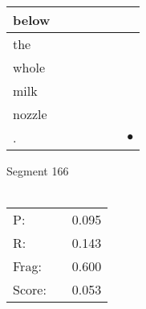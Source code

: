\documentclass[landscape]{article}
\newcommand{\ssp}{\hspace{2pt}}
\newcommand{\mex}{\cellcolor{g}$\bullet$}
\begin{document}
\begin{tabular}{|l|p{10pt}|p{10pt}|p{10pt}|p{10pt}|p{10pt}|p{10pt}|}
\hline
\ssp below \ssp&\hspace{2pt}&\hspace{2pt}&\hspace{2pt}&\hspace{2pt}&\hspace{2pt}&\hspace{2pt}\\
\hline
\ssp the \ssp&\hspace{2pt}&\hspace{2pt}&\hspace{2pt}&\hspace{2pt}&\hspace{2pt}&\hspace{2pt}\\
\hline
\ssp whole \ssp&\hspace{2pt}&\hspace{2pt}&\hspace{2pt}&\hspace{2pt}&\hspace{2pt}&\hspace{2pt}\\
\hline
\ssp milk \ssp&\hspace{2pt}&\hspace{2pt}&\hspace{2pt}&\hspace{2pt}&\hspace{2pt}&\hspace{2pt}\\
\hline
\ssp nozzle \ssp&\hspace{2pt}&\hspace{2pt}&\hspace{2pt}&\hspace{2pt}&\hspace{2pt}&\hspace{2pt}\\
\hline
\ssp \cellcolor{ref5}. \ssp&\hspace{2pt}&\hspace{2pt}&\hspace{2pt}&\hspace{2pt}&\hspace{2pt}&\hspace{2pt}\mex\\
\hline
\end{tabular}

\vspace{6pt}
\noindent Segment 166\\\\
\noindent\begin{tabular}{lm{12pt}r}
\hline
P:&&0.095\\
R:&&0.143\\
Frag:&&0.600\\
Score:&&0.053\\
\end{tabular}
\end{document}
